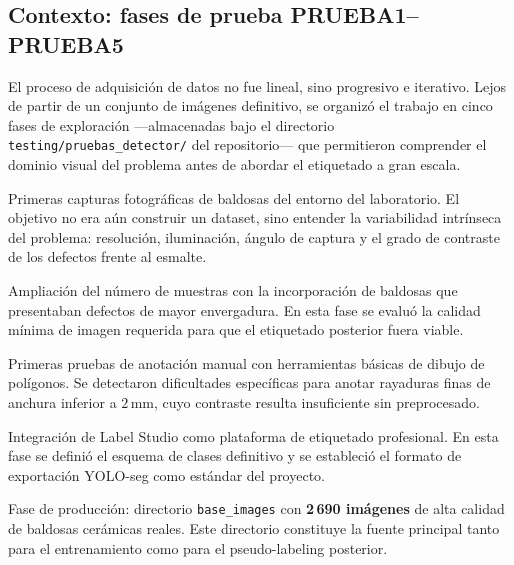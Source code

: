 \documentclass[12pt,a4paper]{article}
\begin{document}
\subsection{Contexto: fases de prueba PRUEBA1–PRUEBA5}

El proceso de adquisición de datos no fue lineal, sino progresivo e iterativo.
Lejos de partir de un conjunto de imágenes definitivo, se organizó el trabajo en
cinco fases de exploración —almacenadas bajo el directorio \texttt{testing/pruebas\_detector/}
del repositorio— que permitieron comprender el dominio visual del problema antes de
abordar el etiquetado a gran escala.

\begin{description}[leftmargin=2cm,style=nextline]
  \item[\texttt{PRUEBA1}]
    Primeras capturas fotográficas de baldosas del entorno del laboratorio.
    El objetivo no era aún construir un dataset, sino entender la variabilidad
    intrínseca del problema: resolución, iluminación, ángulo de captura y el grado
    de contraste de los defectos frente al esmalte.

  \item[\texttt{PRUEBA2}]
    Ampliación del número de muestras con la incorporación de baldosas que presentaban
    defectos de mayor envergadura. En esta fase se evaluó la calidad mínima de imagen
    requerida para que el etiquetado posterior fuera viable.

  \item[\texttt{PRUEBA3}]
    Primeras pruebas de anotación manual con herramientas básicas de dibujo de
    polígonos. Se detectaron dificultades específicas para anotar rayaduras finas
    de anchura inferior a $2\,$mm, cuyo contraste resulta insuficiente sin preprocesado.

  \item[\texttt{PRUEBA4}]
    Integración de Label Studio como plataforma de etiquetado profesional.
    En esta fase se definió el esquema de clases definitivo y se estableció el formato
    de exportación YOLO-seg como estándar del proyecto.

  \item[\texttt{PRUEBA5}]
    Fase de producción: directorio \texttt{base\_images} con \textbf{2\,690 imágenes}
    de alta calidad de baldosas cerámicas reales. Este directorio constituye la fuente
    principal tanto para el entrenamiento como para el pseudo-labeling posterior.
\end{description}
\end{document}
